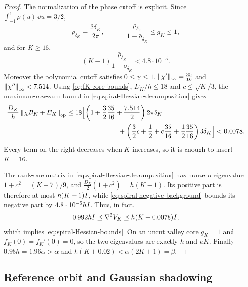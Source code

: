 \begin{proof}
    The normalization of the phase cutoff is explicit. Since
    $\int_{-1}^1\rho(u)\,\dd u=3/2$,
    \begin{equation*}
        \bar\rho_{\delta_K}=\frac{3\delta_K}{2\pi},
        \qquad
        -\frac{\bar\rho_{\delta_K}}{1-\bar\rho_{\delta_K}}\leq g_K\leq1,
    \end{equation*}
    and for $K\geq16$,
    \begin{equation}\label{eq:spiral-negative-background}
        (K-1)\frac{\bar\rho_{\delta_K}}{1-\bar\rho_{\delta_K}}<4.8\cdot10^{-5} .
    \end{equation}
    Moreover the polynomial cutoff satisfies
    $0\leq\chi\leq1$, $\left\lVert \chi'\right\rVert_\infty=\tfrac{35}{16}$ and
    $\left\lVert \chi''\right\rVert_\infty<7.514$. Using \eqref{eq:fK-core-bounds}, $D_K/h\leq18$ and
    $c\leq\sqrt K/3$, the maximum-row-sum bound in
    \eqref{eq:spiral-Hessian-decomposition} gives
    \begin{align*}
        \frac{D_K}h\norm{\chi B_K+E_K}_\op
        &\leq18\Bigl[
            \left(1+\frac32\frac{35}{16}+\frac{7.514}2\right)2\pi\delta_K\\
        &\hspace{27mm}
            +\left(\frac32c+\frac12+c\frac{35}{16}+\frac12\frac{35}{16}\right)3\delta_K
        \Bigr]
        <0.0078 .
    \end{align*}
    Every term on the right decreases when $K$ increases, so it is enough to insert $K=16$.

    The rank-one matrix in \eqref{eq:spiral-Hessian-decomposition} has nonzero eigenvalue
    $1+c^2=(K+7)/9$, and $\tfrac{D_K}2(1+c^2)=h(K-1)$. Its positive part is therefore at most
    $h(K-1)I$, while \eqref{eq:spiral-negative-background} bounds its negative part by
    $4.8\cdot10^{-5}hI$. Thus, in fact,
    \begin{equation*}
        0.992hI\preceq\nabla^2V_K\preceq h(K+0.0078)I,
    \end{equation*}
    which implies \eqref{eq:spiral-Hessian-bounds}. On an uncut valley core $g_K=1$ and
    $f_K(0)=f_K'(0)=0$, so the two eigenvalues are exactly $h$ and $hK$. Finally
    $0.98h=1.96\alpha>\alpha$ and $h(K+0.02)<\alpha(2K+1)=\beta$.
\end{proof}

\subsection{Reference orbit and Gaussian shadowing}

